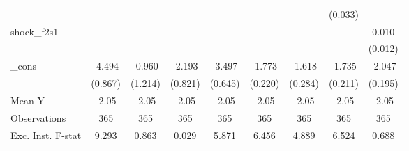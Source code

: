 {\begin{tabular}{l*{8}{c}}
            &                     &                     &                     &                     &                     &                     &     (0.033)         &                     \\
\addlinespace
shock\_f2s1  &                     &                     &                     &                     &                     &                     &                     &       0.010         \\
            &                     &                     &                     &                     &                     &                     &                     &     (0.012)         \\
\addlinespace
\_cons      &      -4.494\sym{***}&      -0.960         &      -2.193\sym{**} &      -3.497\sym{***}&      -1.773\sym{***}&      -1.618\sym{***}&      -1.735\sym{***}&      -2.047\sym{***}\\
            &     (0.867)         &     (1.214)         &     (0.821)         &     (0.645)         &     (0.220)         &     (0.284)         &     (0.211)         &     (0.195)         \\
\midrule
Mean Y      &       -2.05         &       -2.05         &       -2.05         &       -2.05         &       -2.05         &       -2.05         &       -2.05         &       -2.05         \\
Observations&         365         &         365         &         365         &         365         &         365         &         365         &         365         &         365         \\
Exc. Inst. F-stat&       9.293         &       0.863         &       0.029         &       5.871         &       6.456         &       4.889         &       6.524         &       0.688         \\
\bottomrule
\end{tabular}
}
